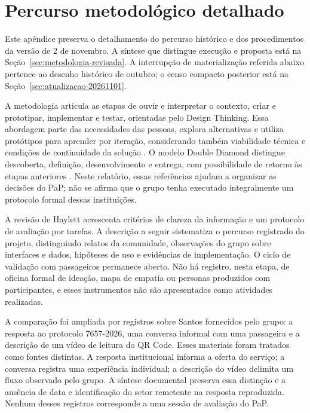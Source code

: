 \chapter{Percurso metodológico detalhado}\label{ap:percurso-metodologico}
Este apêndice preserva o detalhamento do percurso histórico e dos procedimentos da versão de 2 de novembro. A síntese que distingue execução e proposta está na Seção~\ref{sec:metodologia-revisada}. A interrupção de materialização referida abaixo pertence ao desenho histórico de outubro; o censo compacto posterior está na Seção~\ref{sec:atualizacao-20261101}.

A metodologia articula as etapas de ouvir e interpretar o contexto, criar e prototipar, implementar e testar, orientadas pelo Design Thinking. Essa abordagem parte das necessidades das pessoas, explora alternativas e utiliza protótipos para aprender por iteração, considerando também viabilidade técnica e condições de continuidade da solução \citep{ideo-designthinking}. O modelo Double Diamond distingue descoberta, definição, desenvolvimento e entrega, com possibilidade de retorno às etapas anteriores \citep{designcouncil}. Neste relatório, essas referências ajudam a organizar as decisões do PaP; não se afirma que o grupo tenha executado integralmente um protocolo formal dessas instituições.

A revisão de Haylett acrescenta critérios de clareza da informação e um protocolo de avaliação por tarefas. A descrição a seguir sistematiza o percurso registrado do projeto, distinguindo relatos da comunidade, observações do grupo sobre interfaces e dados, hipóteses de uso e evidências de implementação. O ciclo de validação com passageiros permanece aberto. Não há registro, nesta etapa, de oficina formal de ideação, mapa de empatia ou personas produzidos com participantes, e esses instrumentos não são apresentados como atividades realizadas.

A comparação foi ampliada por registros sobre Santos fornecidos pelo grupo: a resposta ao protocolo 7657-2026, uma conversa informal com uma passageira e a descrição de um vídeo de leitura do QR Code. Esses materiais foram tratados como fontes distintas. A resposta institucional informa a oferta do serviço; a conversa registra uma experiência individual; a descrição do vídeo delimita um fluxo observado pelo grupo. A síntese documental preserva essa distinção e a ausência de data e identificação do setor remetente na resposta reproduzida. Nenhum desses registros corresponde a uma sessão de avaliação do PaP.


